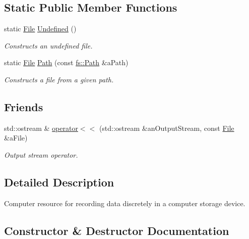 \subsection*{Static Public Member Functions}
\begin{DoxyCompactItemize}
\item 
static \hyperlink{classlibrary_1_1core_1_1fs_1_1_file}{File} \hyperlink{classlibrary_1_1core_1_1fs_1_1_file_af45fa5c36c359a979149845ef06586e6}{Undefined} ()
\begin{DoxyCompactList}\small\item\em Constructs an undefined file. \end{DoxyCompactList}\item 
static \hyperlink{classlibrary_1_1core_1_1fs_1_1_file}{File} \hyperlink{classlibrary_1_1core_1_1fs_1_1_file_a72d6cdf8bb7e299889c6149e2b8a6cc7}{Path} (const \hyperlink{classlibrary_1_1core_1_1fs_1_1_path}{fs\+::\+Path} \&a\+Path)
\begin{DoxyCompactList}\small\item\em Constructs a file from a given path. \end{DoxyCompactList}\end{DoxyCompactItemize}
\subsection*{Friends}
\begin{DoxyCompactItemize}
\item 
std\+::ostream \& \hyperlink{classlibrary_1_1core_1_1fs_1_1_file_a82ce9f27653427d53ecb90de978f4f68}{operator$<$$<$} (std\+::ostream \&an\+Output\+Stream, const \hyperlink{classlibrary_1_1core_1_1fs_1_1_file}{File} \&a\+File)
\begin{DoxyCompactList}\small\item\em Output stream operator. \end{DoxyCompactList}\end{DoxyCompactItemize}


\subsection{Detailed Description}
Computer resource for recording data discretely in a computer storage device. 

\subsection{Constructor \& Destructor Documentation}
\mbox{\label{classlibrary_1_1core_1_1fs_1_1_file_a6f3f0d79545ac9984c6f49432f0c6c39}} 
